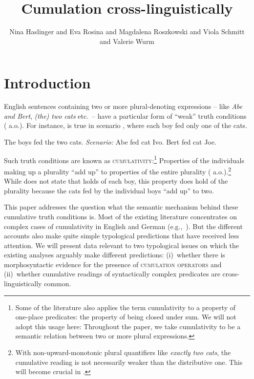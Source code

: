\documentclass[output=paper]{langscibook}
\author{Nina Haslinger\affiliation{Georg-August-Universität Göttingen} and
Eva Rosina\affiliation{Universität Wien} and
Magdalena Roszkowski\affiliation{Central European University} and
Viola Schmitt\affiliation{Humboldt-Universität zu Berlin} and
Valerie Wurm\affiliation{Humboldt-Universität zu Berlin}}
\title{Cumulation cross-linguistically}
\begin{document}
\maketitle

\section{Introduction}\label{has-sch:sec:1}\largerpage

English sentences containing two or more plural-denoting expressions -- like \textit{Abe and Bert}, \textit{(the) two cats} etc.~-- have a particular form of ``weak'' truth conditions (\citealt{Kroch:1974, Langendoen:1978, Scha:1981, Krifka:1986} a.o.). For instance,  is true in scenario , where each boy fed only one of the cats.

\ea \label{has-sch:1}
\ea\label{has-sch:1a} The boys fed the two cats. 
\ex\label{has-sch:1b} \textit{Scenario:} Abe fed cat Ivo. Bert fed cat Joe. 
\z\z

\noindent Such truth conditions are known as \textsc{cumulativity}:\footnote{Some of the literature also applies the term cumulativity to a property of one-place predicates: the property of being closed under sum. We will not adopt this usage here: Throughout the paper, we take cumulativity to be a semantic relation between two or more plural expressions.} Properties of the individuals making up a plurality ``add up'' to properties of the entire plurality (\citealt{Link:1983, Krifka:1986, Sternefeld:1998} a.o.).\footnote{With non-upward-monotonic plural quantifiers like \textit{exactly two cats}, the cumulative reading is not necessarily weaker than the distributive one. This will become crucial in .} While  does not state that  holds of each boy, this property does hold of the plurality  because the cats fed by the individual boys ``add up'' to two.

This paper addresses the question what the semantic mechanism behind these cumulative truth conditions is. Most of the existing literature concentrates on complex cases of cumulativity in English and German (e.g.,~\citealt{Schein:1993,Beck:2000a,Champollion:2010a,Schmitt:2019}). But the different accounts also make quite simple typological predictions that have received less attention. We will present data relevant to two typological issues on which the existing analyses arguably make different predictions: (i)~whether there is morphosyntactic evidence for the presence of \textsc{cumulation operators} and (ii)~whether cumulative readings of syntactically complex predicates are cross-linguistically common.
\end{document}
